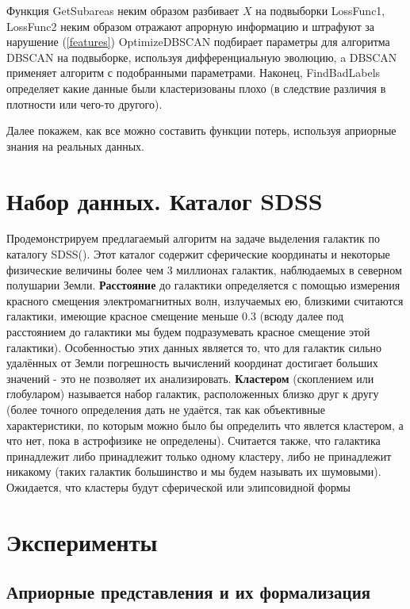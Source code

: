 \documentclass[12pt,fleqn]{article}
\begin{document}
Функция GetSubareas  неким образом разбивает $X$ на подвыборки
LossFunc1, LossFunc2 неким образом отражают апрорную информацию и штрафуют за нарушение (\ref{features})
OptimizeDBSCAN подбирает параметры для алгоритма DBSCAN на подвыборке, используя дифференциальную эволюцию, a DBSCAN применяет алгоритм с подобранными параметрами. Наконец, FindBadLabels определяет какие данные были кластеризованы плохо (в следствие различия в плотности или чего-то другого).

Далее покажем, как все можно составить функции потерь, используя априорные знания на реальных данных.

\section{Набор данных. Каталог SDSS}

Продемонстрируем предлагаемый алгоритм на задаче выделения галактик по каталогу SDSS(\cite{SDSS}). Этот каталог содержит сферические координаты и некоторые физические величины более чем 3 миллионах галактик, наблюдаемых в северном полушарии Земли. \textbf{Расстояние} до галактики определяется с помощью измерения красного смещения электромагнитных волн, излучаемых ею, близкими считаются галактики, имеющие красное смещение меньше 0.3 (всюду далее под расстоянием до галактики мы будем подразумевать красное смещение этой галактики). Особенностью этих данных является то, что для галактик сильно удалённых от Земли погрешность вычислений координат достигает больших значений - это не позволяет их анализировать. \textbf{Кластером} (скоплением или глобуларом) называется набор галактик, расположенных близко друг к другу (более точного определения дать не удаётся, так как объективные характеристики, по которым можно было бы определить что явлется кластером, а что нет, пока в астрофизике не определены). Считается также, что галактика принадлежит либо принадлежит только одному кластеру, либо не принадлежит никакому (таких галактик большинство и мы будем называть их шумовыми).
Ожидается, что кластеры будут сферической или элипсовидной формы

\section{Эксперименты}
\subsection{Априорные представления и их формализация}
\end{document}

